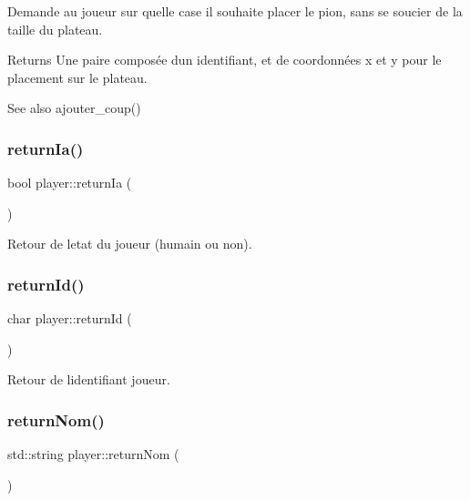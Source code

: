 Demande au joueur sur quelle case il souhaite placer le pion, sans se soucier de la taille du plateau. \begin{DoxyReturn}{Returns}
Une paire composée d\textquotesingle{}un identifiant, et de coordonnées x et y pour le placement sur le plateau. 
\end{DoxyReturn}
\begin{DoxySeeAlso}{See also}
ajouter\+\_\+coup() 
\end{DoxySeeAlso}
\mbox{\label{classplayer_ac9ddc8bf95e4b1fc87658a3d8426b394}} 
\subsubsection{\texorpdfstring{return\+Ia()}{returnIa()}}
{\footnotesize\ttfamily bool player\+::return\+Ia (\begin{DoxyParamCaption}{ }\end{DoxyParamCaption})\hspace{0.3cm}{\ttfamily [inline]}}



Retour de l\textquotesingle{}etat du joueur (humain ou non). 

\mbox{\label{classplayer_a6e4d00a9bdc81a1c4bc7cc5aef766510}} 
\subsubsection{\texorpdfstring{return\+Id()}{returnId()}}
{\footnotesize\ttfamily char player\+::return\+Id (\begin{DoxyParamCaption}{ }\end{DoxyParamCaption})\hspace{0.3cm}{\ttfamily [inline]}}



Retour de l\textquotesingle{}identifiant joueur. 

\mbox{\label{classplayer_ada00e16c16ff0be00896b1f6df9a21de}} 
\subsubsection{\texorpdfstring{return\+Nom()}{returnNom()}}
{\footnotesize\ttfamily std\+::string player\+::return\+Nom (\begin{DoxyParamCaption}{ }\end{DoxyParamCaption})\hspace{0.3cm}{\ttfamily [inline]}}



